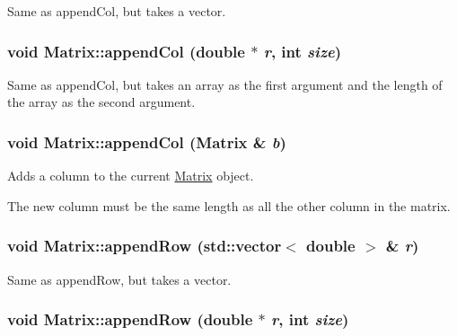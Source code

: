 Same as appendCol, but takes a vector. 

\hypertarget{class_matrix_aae8efe9de26740e3c953e43de55963b2}{
\subsubsection[{appendCol}]{\setlength{\rightskip}{0pt plus 5cm}void Matrix::appendCol (double $\ast$ {\em r}, \/  int {\em size})}}
\label{class_matrix_aae8efe9de26740e3c953e43de55963b2}


Same as appendCol, but takes an array as the first argument and the length of the array as the second argument. 

\hypertarget{class_matrix_a6d7061bb02cf34f6c79a01ff25b41e84}{
\subsubsection[{appendCol}]{\setlength{\rightskip}{0pt plus 5cm}void Matrix::appendCol ({\bf Matrix} \& {\em b})}}
\label{class_matrix_a6d7061bb02cf34f6c79a01ff25b41e84}


Adds a column to the current \hyperlink{class_matrix}{Matrix} object. 

The new column must be the same length as all the other column in the matrix. \hypertarget{class_matrix_a934b0686d9a2b971e9740b9a29224a54}{
\subsubsection[{appendRow}]{\setlength{\rightskip}{0pt plus 5cm}void Matrix::appendRow (std::vector$<$ double $>$ \& {\em r})}}
\label{class_matrix_a934b0686d9a2b971e9740b9a29224a54}


Same as appendRow, but takes a vector. 

\hypertarget{class_matrix_a55104cb3fcf93a887ac713955fc0f5c9}{
\subsubsection[{appendRow}]{\setlength{\rightskip}{0pt plus 5cm}void Matrix::appendRow (double $\ast$ {\em r}, \/  int {\em size})}}
\label{class_matrix_a55104cb3fcf93a887ac713955fc0f5c9}


